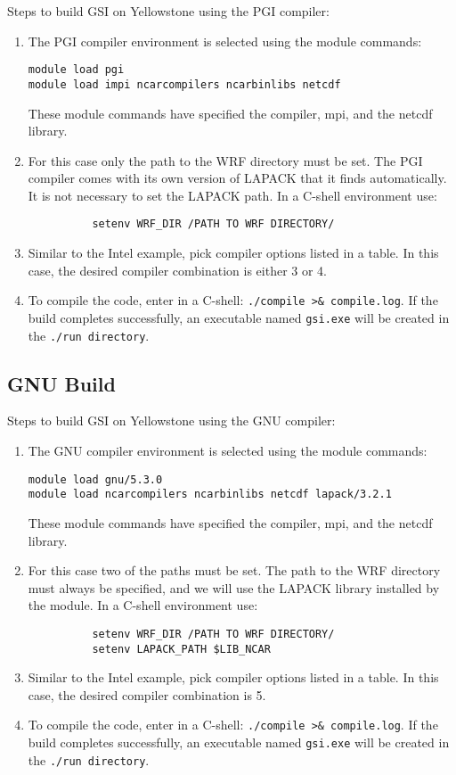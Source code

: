 Steps to build GSI on Yellowstone using the PGI compiler:
\begin{enumerate}
\item The PGI compiler environment is selected using the module commands:
\begin{verbatim}
module load pgi
module load impi ncarcompilers ncarbinlibs netcdf
\end{verbatim}
These module commands have specified the compiler, mpi, and the netcdf library.
\item For this case only the path to the WRF directory must be set. The PGI compiler comes with its own version of LAPACK that it finds automatically. It is not necessary to set the LAPACK path. In a C-shell environment use:
\begin{verbatim}
          setenv WRF_DIR /PATH TO WRF DIRECTORY/
\end{verbatim}
\item Similar to the Intel example, pick compiler options listed in a table. In this case, the desired compiler combination is either 3 or 4.
\item To compile the code, enter in a C-shell: \verb|./compile >& compile.log|. If the build completes successfully, an executable named \verb|gsi.exe| will be created in the \verb|./run directory|.
\end{enumerate}

\subsection{GNU Build}

Steps to build GSI on Yellowstone using the GNU compiler:
\begin{enumerate}
\item The GNU compiler environment is selected using the module commands:
\begin{verbatim}
module load gnu/5.3.0
module load ncarcompilers ncarbinlibs netcdf lapack/3.2.1 
\end{verbatim}
These module commands have specified the compiler, mpi, and the netcdf library.
\item For this case two of the paths must be set. The path to the WRF directory must always be specified, and we will use the LAPACK library installed by the module.  In a C-shell environment use:
\begin{verbatim}
          setenv WRF_DIR /PATH TO WRF DIRECTORY/
          setenv LAPACK_PATH $LIB_NCAR
\end{verbatim}
\item Similar to the Intel example, pick compiler options listed in a table. In this case, the desired compiler combination is 5.
\item To compile the code, enter in a C-shell: \verb|./compile >& compile.log|. If the build completes successfully, an executable named \verb|gsi.exe| will be created in the \verb|./run directory|.
\end{enumerate}

